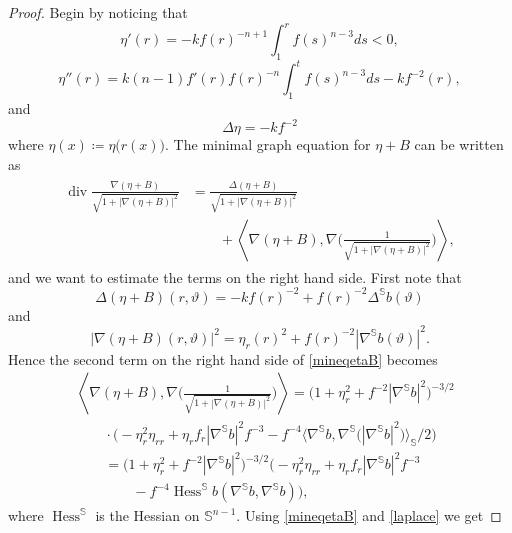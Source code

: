 \documentclass[10pt,a4paper,reqno]{amsart}
\newcommand{\Ss}{\mathbb{S}}
\newcommand{\ang}[1]{\left\langle #1 \right\rangle}
\DeclareMathOperator\dv{div}
\DeclareMathOperator\Hess{Hess}
\numberwithin{equation}{section}
\theoremstyle{plain}
\theoremstyle{definition}
\begin{document}
\begin{proof}
Begin by noticing that
  \begin{equation*}
   \eta'(r) = - k f(r)^{-n+1} \int_1^r f(s)^{n-3} ds < 0,
  \end{equation*}
  \begin{equation*}
   \eta''(r) = k(n-1) f'(r)f(r)^{-n} \int_1^t f(s)^{n-3}ds - k f^{-2}(r),
  \end{equation*}
and
 \begin{equation*}
   \Delta\eta = - k f^{-2}
  \end{equation*}
  where $\eta(x)\coloneqq\eta\bigl(r(x)\bigr)$.
The minimal graph equation for $\eta + B$ can be written as
    \begin{align}\label{mineqetaB}\begin{split}
      \dv \frac{\nabla(\eta+B)}{\sqrt{1+|\nabla(\eta+B)|^2}} &=
        \frac{\Delta (\eta+B)}{\sqrt{1+|\nabla(\eta+B)|^2}} \\
     &\qquad + \ang{\nabla(\eta+B), \nabla\Big(\frac{1}{\sqrt{1+|\nabla(\eta+B)|^2}}\Big)},\end{split}
    \end{align}
and we want to estimate the terms on the right hand side. First note that
    \begin{equation}\label{laplace}
        \Delta (\eta+B)(r,\vartheta) = - k f(r)^{-2} + f(r)^{-2}\Delta^{\Ss} b(\vartheta)
    \end{equation}
and
    \begin{equation*}
      |\nabla(\eta+B)(r,\vartheta)|^2 = \eta_r(r)^2 + f(r)^{-2} |\nabla^{\Ss}b(\vartheta)|^2.
    \end{equation*} 
Hence the second term on the right hand side of \eqref{mineqetaB} becomes
\begin{align*}
     & \ang{\nabla(\eta+B), \nabla\Big(\frac{1}{\sqrt{1+|\nabla(\eta+B)|^2}}\Big)} =
      \big( 1+\eta_r^2 + f^{-2}|\nabla^{\Ss} b|^2\big)^{-3/2} \\ &\qquad \cdot
      \Big( -\eta_r^2\eta_{rr} + \eta_r f_r |\nabla^{\Ss} b|^2 f^{-3}
      - f^{-4}\bigl\langle \nabla^{\Ss}b,\nabla^{\Ss}\bigl(|\nabla^{\Ss}b|^2\bigr)\bigr\rangle_{\Ss}/2 \Big)\\
&\qquad =
   \big( 1+\eta_r^2 + f^{-2}|\nabla^{\Ss} b|^2\big)^{-3/2}  
  \Big( -\eta_r^2\eta_{rr} + \eta_r f_r |\nabla^{\Ss} b|^2 f^{-3}\\
&\qquad\qquad      - f^{-4}\Hess^{\Ss}b(\nabla^{\Ss}b,\nabla^{\Ss}b)\Big),
           \end{align*}
where $\Hess^{\Ss}$ is the Hessian on $\Ss^{n-1}$. 
Using \eqref{mineqetaB} and \eqref{laplace} we get  

\end{proof}
\end{document}
